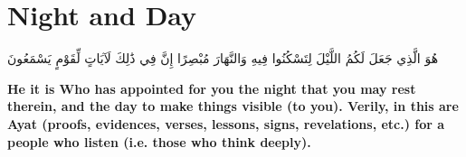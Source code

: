 \chapter{Night and Day}
\begin{center}
    {\Huge    
        \begin{Arabic}
            هُوَ الَّذِي جَعَلَ لَكُمُ اللَّيْلَ لِتَسْكُنُوا فِيهِ وَالنَّهَارَ مُبْصِرًا إِنَّ فِي ذَٰلِكَ لَآيَاتٍ لِّقَوْمٍ يَسْمَعُونَ
        \end{Arabic}
    }    
\end{center}
\vspace*{\fill}
\vspace{3cm}
\begin{center}
    \large \textbf{He it is Who has appointed for you the night that you may rest therein, and the day to make things visible (to you). Verily, in this are Ayat (proofs, evidences, verses, lessons, signs, revelations, etc.) for a people who listen (i.e. those who think deeply).}
\end{center}
